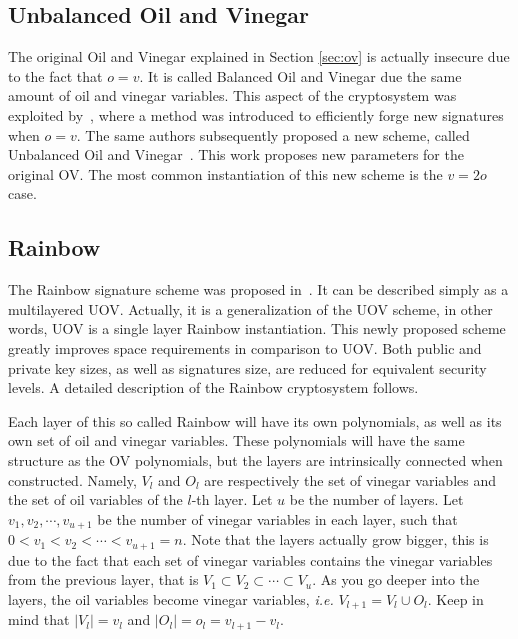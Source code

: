 \documentclass{ufsctex/ufsctex}
\begin{document}
\subsection{Unbalanced Oil and Vinegar}

The original Oil and Vinegar explained in Section \ref{sec:ov} is actually
insecure due to the fact that $o = v$. It is called Balanced Oil and Vinegar
due the same amount of oil and vinegar variables. This aspect of the
cryptosystem was exploited by~\cite{kipnis1998cryptanalysis}, where a method
was introduced to efficiently forge new signatures when $o = v$. The same
authors subsequently proposed a new scheme, called Unbalanced Oil and
Vinegar~\cite{kipnis1999unbalanced}. This work proposes new parameters for the
original OV. The most common instantiation of this new scheme is the $v = 2o$
case.

\subsection{Rainbow}\label{sec:rainbow}

The Rainbow signature scheme was proposed in~\cite{ding2005rainbow}. It can be
described simply as a multilayered UOV. Actually, it is a generalization of the
UOV scheme, in other words, UOV is a single layer Rainbow instantiation. This
newly proposed scheme greatly improves space requirements in comparison to UOV.
Both public and private key sizes, as well as signatures size, are reduced for
equivalent security levels. A detailed description of the Rainbow cryptosystem
follows.

Each layer of this so called Rainbow will have its own polynomials, as well as
its own set of oil and vinegar variables. These polynomials will have the same
structure as the OV polynomials, but the layers are intrinsically connected
when constructed. Namely, $V_l$ and $O_l$ are respectively the set of vinegar
variables and the set of oil variables of the $l$-th layer. Let $u$ be the
number of layers. Let $v_1, v_2, \cdots, v_{u+1}$ be the number of vinegar
variables in each layer, such that $0 < v_1 < v_2 < \cdots < v_{u+1} = n$. Note
that the layers actually grow bigger, this is due to the fact that each set of
vinegar variables contains the vinegar variables from the previous layer, that
is $V_1 \subset V_2 \subset \cdots \subset V_{u}$. As you go deeper into the
layers, the oil variables become vinegar variables, \textit{i.e.} $V_{l+1} =
V_l \cup O_l$. Keep in mind that $|V_l| = v_l$ and $|O_l| = o_l = v_{l+1} -
v_{l}$.
\end{document}
